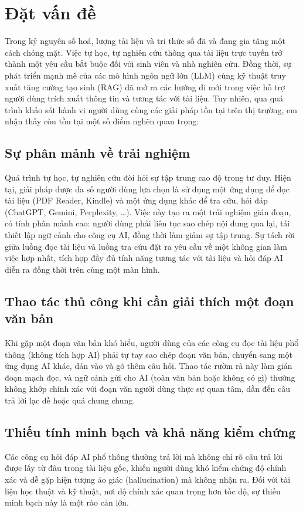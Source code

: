 \section{Đặt vấn đề}
Trong kỷ nguyên số hoá, lượng tài liệu và tri thức số đã và đang gia tăng một cách chóng mặt. Việc tự học, tự nghiên cứu thông qua tài liệu trực tuyến trở thành một yêu cầu bắt buộc đối với sinh viên và nhà nghiên cứu. Đồng thời, sự phát triển mạnh mẽ của các mô hình ngôn ngữ lớn (LLM) cùng kỹ thuật truy xuất tăng cường tạo sinh (RAG) đã mở ra các hướng đi mới trong việc hỗ trợ người dùng trích xuất thông tin và tương tác với tài liệu. Tuy nhiên, qua quá trình khảo sát hành vi người dùng cùng các giải pháp tồn tại trên thị trường, em nhận thấy còn tồn tại một số điểm nghẽn quan trọng:
\subsection{Sự phân mảnh về trải nghiệm}
Quá trình tự học, tự nghiên cứu đòi hỏi sự tập trung cao độ trong tư duy. Hiện tại, giải pháp được đa số người dùng lựa chọn là sử dụng một ứng dụng để đọc tài liệu (PDF Reader, Kindle) và một ứng dụng khác để tra cứu, hỏi đáp (ChatGPT, Gemini, Perplexity, \ldots). Việc này tạo ra một trải nghiệm gián đoạn, có tính phân mảnh cao: người dùng phải liên tục sao chép nội dung qua lại, tái thiết lập ngữ cảnh cho công cụ AI, đồng thời làm giảm sự tập trung. Sự tách rời giữa luồng đọc tài liệu và luồng tra cứu đặt ra yêu cầu về một không gian làm việc hợp nhất, tích hợp đầy đủ tính năng tương tác với tài liệu và hỏi đáp AI diễn ra đồng thời trên cùng một màn hình.
\subsection{Thao tác thủ công khi cần giải thích một đoạn văn bản}
Khi gặp một đoạn văn bản khó hiểu, người dùng của các công cụ đọc tài liệu phổ thông (không tích hợp AI) phải tự tay sao chép đoạn văn bản, chuyển sang một ứng dụng AI khác, dán vào và gõ thêm câu hỏi. Thao tác rườm rà này làm gián đoạn mạch đọc, và ngữ cảnh gửi cho AI (toàn văn bản hoặc không có gì) thường không khớp chính xác với đoạn văn người dùng thực sự quan tâm, dẫn đến câu trả lời lạc đề hoặc quá chung chung.
\subsection{Thiếu tính minh bạch và khả năng kiểm chứng}
Các công cụ hỏi đáp AI phổ thông thường trả lời mà không chỉ rõ câu trả lời được lấy từ đâu trong tài liệu gốc, khiến người dùng khó kiểm chứng độ chính xác và dễ gặp hiện tượng ảo giác (hallucination) mà không nhận ra. Đối với tài liệu học thuật và kỹ thuật, nơi độ chính xác quan trọng hơn tốc độ, sự thiếu minh bạch này là một rào cản lớn.
